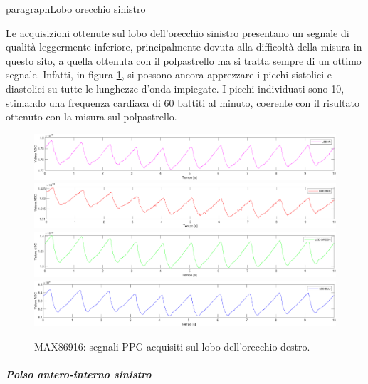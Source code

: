 paragraph{Lobo orecchio sinistro}

Le acquisizioni ottenute sul lobo dell'orecchio sinistro presentano un segnale di qualità leggermente inferiore, principalmente dovuta alla difficoltà della misura in questo sito, a quella ottenuta con il polpastrello ma si tratta sempre di un ottimo segnale. Infatti, in figura \ref{fig:soggetto2_MAX86916_lobo}, si possono ancora apprezzare i picchi sistolici e diastolici su tutte le lunghezze d'onda impiegate. I picchi individuati sono 10, stimando una frequenza cardiaca di 60 battiti al minuto, coerente con il risultato ottenuto con la misura sul polpastrello.
\begin{figure}[h]
	\centering
	\includegraphics[width=1\linewidth]{ImageFiles/Misure Preliminari/Soggetto 2/max86916/lobo_ired}
	\includegraphics[width=1\linewidth]{ImageFiles/Misure Preliminari/Soggetto 2/max86916/lobo_red}
	\includegraphics[width=1\linewidth]{ImageFiles/Misure Preliminari/Soggetto 2/max86916/lobo_green}
	\includegraphics[width=1\linewidth]{ImageFiles/Misure Preliminari/Soggetto 2/max86916/lobo_blu}
	\caption{MAX86916: segnali PPG acquisiti sul lobo dell'orecchio destro.}
	\label{fig:soggetto2_MAX86916_lobo}
\end{figure}

\subparagraph{Polso antero-interno sinistro}

